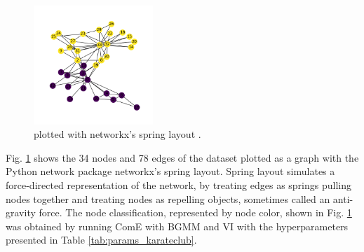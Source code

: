 \documentclass[conference]{IEEEtran}
\begin{document}
\begin{figure}
    \centering
    \includegraphics[width=0.4\textwidth]{images/karateclub/spring.png}
    \caption{ plotted with networkx's spring layout \cite{KarateClubDS, networkx}.}
    \label{fig:karateclub_spring}
\end{figure}

Fig. \ref{fig:karateclub_spring} shows the 34 nodes and 78 edges of the  dataset plotted as a graph with the Python network package networkx's spring layout.\cite{networkx} Spring layout simulates a force-directed representation of the network, by treating edges as springs pulling nodes together and treating nodes as repelling objects, sometimes called an anti-gravity force.\cite{networkx} The node classification, represented by node color, shown in Fig. \ref{fig:karateclub_spring} was obtained by running ComE with BGMM and VI with the hyperparameters presented in Table \ref{tab:params_karateclub}.
\end{document}
